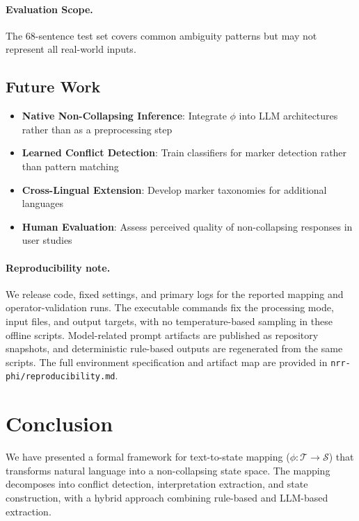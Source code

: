 \documentclass[11pt,a4paper]{article}
\begin{document}
\paragraph{Evaluation Scope.}
The 68-sentence test set covers common ambiguity patterns but may not represent 
all real-world inputs.

\subsection{Future Work}

\begin{itemize}
    \item \textbf{Native Non-Collapsing Inference}: Integrate $\phi$ into LLM 
          architectures rather than as a preprocessing step
    \item \textbf{Learned Conflict Detection}: Train classifiers for marker 
          detection rather than pattern matching
    \item \textbf{Cross-Lingual Extension}: Develop marker taxonomies for 
          additional languages
    \item \textbf{Human Evaluation}: Assess perceived quality of non-collapsing 
          responses in user studies
\end{itemize}

\paragraph{Reproducibility note.}
We release code, fixed settings, and primary logs for the reported mapping and operator-validation runs.
The executable commands fix the processing mode, input files, and output targets, with no temperature-based sampling in these offline scripts.
Model-related prompt artifacts are published as repository snapshots, and deterministic rule-based outputs are regenerated from the same scripts.
The full environment specification and artifact map are provided in \texttt{nrr-phi/reproducibility.md}.

\section{Conclusion}
\label{sec:conclusion}

We have presented a formal framework for text-to-state mapping ($\phi: \mathcal{T} \to \mathcal{S}$) 
that transforms natural language into a non-collapsing state space. The mapping 
decomposes into conflict detection, interpretation extraction, and state construction, 
with a hybrid approach combining rule-based and LLM-based extraction.
\end{document}
